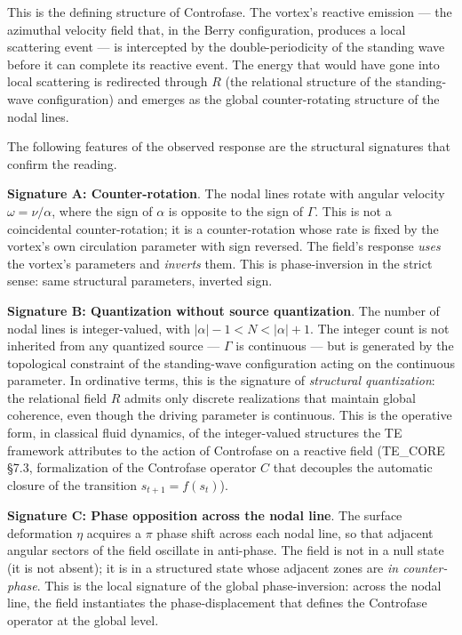 \documentclass[
  11pt,
  a4paper,
]{article}
\begin{document}
This is the defining structure of Controfase. The vortex's reactive
emission --- the azimuthal velocity field that, in the Berry
configuration, produces a local scattering event --- is intercepted by
the double-periodicity of the standing wave before it can complete its
reactive event. The energy that would have gone into local scattering is
redirected through \(R\) (the relational structure of the standing-wave
configuration) and emerges as the global counter-rotating structure of
the nodal lines.

The following features of the observed response are the structural
signatures that confirm the reading.

\textbf{Signature A: Counter-rotation}. The nodal lines rotate with
angular velocity \(\omega = \nu/\alpha\), where the sign of \(\alpha\)
is opposite to the sign of \(\Gamma\). This is not a coincidental
counter-rotation; it is a counter-rotation whose rate is fixed by the
vortex's own circulation parameter with sign reversed. The field's
response \emph{uses} the vortex's parameters and \emph{inverts} them.
This is phase-inversion in the strict sense: same structural parameters,
inverted sign.

\textbf{Signature B: Quantization without source quantization}. The
number of nodal lines is integer-valued, with
\(|\alpha| - 1 < N < |\alpha| + 1\). The integer count is not inherited
from any quantized source --- \(\Gamma\) is continuous --- but is
generated by the topological constraint of the standing-wave
configuration acting on the continuous parameter. In ordinative terms,
this is the signature of \emph{structural quantization}: the relational
field \(R\) admits only discrete realizations that maintain global
coherence, even though the driving parameter is continuous. This is the
operative form, in classical fluid dynamics, of the integer-valued
structures the TE framework attributes to the action of Controfase on a
reactive field (TE\_CORE §7.3, formalization of the Controfase operator
\(C\) that decouples the automatic closure of the transition
\(s_{t+1} = f(s_t)\)).

\textbf{Signature C: Phase opposition across the nodal line}. The
surface deformation \(\eta\) acquires a \(\pi\) phase shift across each
nodal line, so that adjacent angular sectors of the field oscillate in
anti-phase. The field is not in a null state (it is not absent); it is
in a structured state whose adjacent zones are \emph{in counter-phase}.
This is the local signature of the global phase-inversion: across the
nodal line, the field instantiates the phase-displacement that defines
the Controfase operator at the global level.
\end{document}
